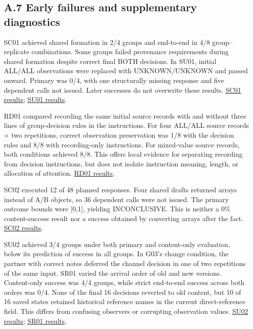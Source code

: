 \documentclass[10pt,a4paper]{article}
\begin{document}
\subsection{A.7 Early failures and supplementary diagnostics}\label{paper-01-a.7-early-failures-and-supplementary-diagnostics}

SC01 achieved shared formation in 2/4 groups and end-to-end \texttt{} in 4/8 group--replicate combinations. Some groups failed provenance requirements during shared formation despite correct final BOTH decisions. In SU01, initial ALL/ALL observations were replaced with UNKNOWN/UNKNOWN and passed onward. Primary \texttt{} was 0/4, with one structurally missing response and five dependent calls not issued. Later successes do not overwrite these results. \href{https://github.com/metaSATOKEN/MRSI/blob/9443de315d283874df0c27e0e99b8c04f400709d/docs/study2/shared-carry-01-results-v0.1-2026-09-18.md}{SC01 results}; \href{https://github.com/metaSATOKEN/MRSI/blob/9443de315d283874df0c27e0e99b8c04f400709d/docs/study2/shared-update-01-results-v0.1-2026-09-18.md}{SU01 results}.

RD01 compared recording the same initial source records with and without three lines of group-decision rules in the instructions. For four ALL/ALL source records × two repetitions, correct observation preservation was 1/8 with the decision rules and 8/8 with recording-only instructions. For mixed-value source records, both conditions achieved 8/8. This offers local evidence for separating recording from decision instructions, but does not isolate instruction meaning, length, or allocation of attention. \href{https://github.com/metaSATOKEN/MRSI/blob/9443de315d283874df0c27e0e99b8c04f400709d/docs/study2/record-decision-01-results-v0.1-2026-09-18.md}{RD01 results}.

SC02 executed 12 of 48 planned responses. Four shared drafts returned arrays instead of A/B objects, so 36 dependent calls were not issued. The primary outcome bounds were {[}0,1{]}, yielding INCONCLUSIVE. This is neither a 0\% content-success result nor a success obtained by converting arrays after the fact. \href{https://github.com/metaSATOKEN/MRSI/blob/9443de315d283874df0c27e0e99b8c04f400709d/docs/study2/shared-carry-02-results-v0.1-2026-09-18.md}{SC02 results}.

SU02 achieved 3/4 groups under both primary and content-only evaluation, below its prediction of success in all groups. In G03's change condition, the partner with correct notes deferred the channel decision in one of two repetitions of the same input. SR01 varied the arrival order of old and new versions. Content-only success was 4/4 groups, while strict end-to-end success across both orders was 0/4. None of the final 16 decisions reverted to old content, but 10 of 16 saved states retained historical reference names in the current direct-reference field. This differs from confusing observers or corrupting observation values. \href{https://github.com/metaSATOKEN/MRSI/blob/9443de315d283874df0c27e0e99b8c04f400709d/docs/study2/shared-update-02-results-v0.1-2026-09-19.md}{SU02 results}; \href{https://github.com/metaSATOKEN/MRSI/blob/9443de315d283874df0c27e0e99b8c04f400709d/docs/study2/shared-recency-01-results-v0.1-2026-09-19.md}{SR01 results}.
\end{document}
